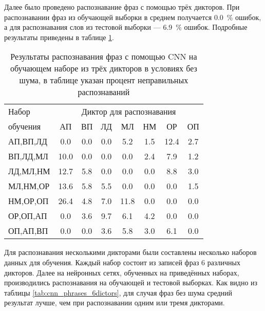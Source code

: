 Далее было проведено распознавание фраз с помощью трёх дикторов.
При распознавании фраз из обучающей выборки в среднем получается 0.0~\% ошибок, а для распознавания слов из тестовой выборки --- 6.9~\% ошибок.
Подробные результаты приведены в таблице \ref{tab:cnn_phrases_3dictors}.

\begin{table}[h]
	\centering
	\caption{Результаты распознавания фраз с помощью CNN на обучающем наборе из трёх дикторов в условиях без шума, в таблице указан процент неправильных распознаваний}
	\label{tab:cnn_phrases_3dictors}
	\begin{tabular}{| l | c | c | c | c | c | c | c |}
		\hline
		Набор & \multicolumn{7}{c|}{Диктор для распознавания} \\
		\hhline{~-------}
		обучения \phantom{0000} & \phantom{0} АП \phantom{0} & \phantom{0} ВП \phantom{0} & \phantom{0} ЛД \phantom{0} & \phantom{0} МЛ \phantom{0} & \phantom{0} НМ \phantom{0} & \phantom{0} ОР \phantom{0} & \phantom{0} ОП \phantom{0} \\
		\hline
		АП,ВП,ЛД &  0.0 &  0.0 &  0.0 &  5.2 &  1.5 & 12.4 &  2.7 \\
		ВП,ЛД,МЛ & 10.0 &  0.0 &  0.0 &  0.0 &  2.4 &  7.9 &  1.2 \\
		ЛД,МЛ,НМ & 12.7 &  5.8 &  0.0 &  0.0 &  0.0 &  8.8 &  3.0 \\
		МЛ,НМ,ОР & 13.6 &  5.8 &  5.5 &  0.0 &  0.0 &  0.0 &  1.5 \\
		НМ,ОР,ОП & 26.4 &  4.8 &  7.0 & 11.8 &  0.0 &  0.0 &  0.0 \\
		ОР,ОП,АП &  0.0 &  3.6 &  9.7 &  6.1 &  4.2 &  0.0 &  0.0 \\
		ОП,АП,ВП &  0.0 &  0.0 &  3.6 &  5.8 &  3.0 &  6.1 &  0.0 \\
		\hline
	\end{tabular}
\end{table}

Для распознавания несколькими дикторами были составлены несколько наборов данных для обучения.
Каждый набор состоит из записей фраз 6 различных дикторов.
Далее на нейронных сетях, обученных на приведённых наборах, производились распознавания на обучающей и тестовой выборках.
Как видно из таблицы \ref{tab:cnn_phrases_6dictors}, для случая фраз без шума средний результат лучше, чем при распознавании одним или тремя дикторами.

